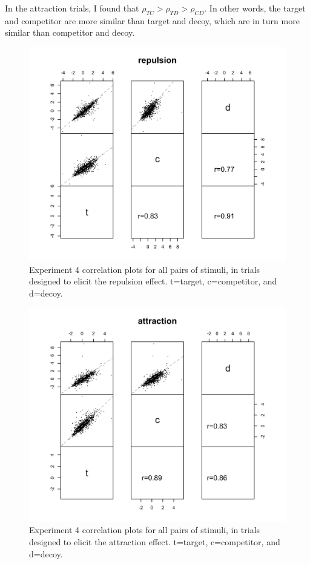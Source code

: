 In the attraction trials, I found that $\rho_{TC}>\rho_{TD}>\rho_{CD}$. In other words, the target and competitor are more similar than target and decoy, which are in turn more similar than competitor and decoy. 

\begin{figure}
    \includegraphics[scale=.5,width=120mm]{figures/price_z_corplot_repulsion.jpeg}
    \caption{Experiment 4 correlation plots for all pairs of stimuli, in trials designed to elicit the repulsion effect. t=target, c=competitor, and d=decoy.}
    \label{fig:price_z_corplot_repulsion}
\end{figure}

\begin{figure}
    \includegraphics[scale=.5,width=120mm]{figures/price_z_corplot_attraction.jpeg}
    \caption{Experiment 4 correlation plots for all pairs of stimuli, in trials designed to elicit the attraction effect. t=target, c=competitor, and d=decoy.}
    \label{fig:price_z_corplot_attraction}
\end{figure}


